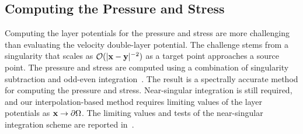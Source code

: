 \documentclass[AMA,STIX1COL]{WileyNJD-v2}
\begin{document}
\subsection{Computing the Pressure and Stress}
\label{sec:pressure_stress}
Computing the layer potentials for the pressure and stress are more
challenging than evaluating the velocity double-layer potential.  The
challenge stems from a singularity that scales as $\mathcal{O}(|{\mathbf{x}} -
{\mathbf{y}}|^{-2})$ as a target point approaches a source point.  The pressure
and stress are computed using a combination of singularity subtraction
and odd-even integration~\cite{sid-isr1988}.  The result is a spectrally
accurate method for computing the pressure and stress.  Near-singular
integration is still required, and our interpolation-based method
requires limiting values of the layer potentials as ${\mathbf{x}} \rightarrow
{\partial}\Omega$.  The limiting values and tests of the near-singular
integration scheme are reported in~\cite{Quaife2014}.

\end{document}
